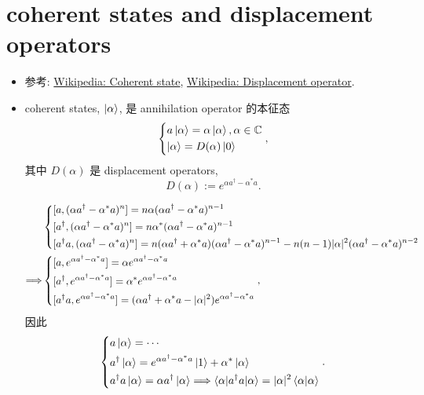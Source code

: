 \documentclass[10pt, a4paper]{article}
\numberwithin{equation}{section}
\begin{document}
	\section{coherent states and displacement operators}
	\begin{itemize}
		\item 参考: \href{https://en.wikipedia.org/wiki/Coherent_state}{Wikipedia: Coherent state}, \href{https://en.wikipedia.org/wiki/Displacement_operator}{Wikipedia: Displacement operator}.
		
		\item coherent states, $\ket{\alpha}$, 是 annihilation operator 的本征态
		\begin{equation}
			\begin{dcases}
				a \ket{\alpha} = \alpha \ket{\alpha}, \alpha \in \mathbb{C} \\
				\ket{\alpha} = D(\alpha) \ket{0}
			\end{dcases},
		\end{equation}
		其中 $D(\alpha)$ 是 displacement operators,
		\begin{equation}
			D(\alpha) := e^{\alpha a^\dag - \alpha^* a}.
		\end{equation}
		
		\begin{tcolorbox}[title=calculation:]
			\begin{align}
				& \begin{dcases}
					[a, (\alpha a^\dag - \alpha^* a)^n] = n \alpha (\alpha a^\dag - \alpha^* a)^{n - 1} \\
					[a^\dag, (\alpha a^\dag - \alpha^* a)^n] = n \alpha^* (\alpha a^\dag - \alpha^* a)^{n - 1} \\
					[a^\dag a, (\alpha a^\dag - \alpha^* a)^n] = n (\alpha a^\dag + \alpha^* a) (\alpha a^\dag - \alpha^* a)^{n - 1} - n (n - 1) |\alpha|^2 (\alpha a^\dag - \alpha^* a)^{n - 2}
				\end{dcases} \notag \\
				\Longrightarrow & \begin{dcases}
					[a, e^{\alpha a^\dag - \alpha^* a}] = \alpha e^{\alpha a^\dag - \alpha^* a} \\
					[a^\dag, e^{\alpha a^\dag - \alpha^* a}] = \alpha^* e^{\alpha a^\dag - \alpha^* a} \\
					[a^\dag a, e^{\alpha a^\dag - \alpha^* a}] = (\alpha a^\dag + \alpha^* a - |\alpha|^2) e^{\alpha a^\dag - \alpha^* a}
				\end{dcases},
			\end{align}
			因此
			\begin{equation} \label{A.4}
				\begin{dcases}
					a \ket{\alpha} = \cdots \\
					a^\dag \ket{\alpha} = e^{\alpha a^\dag - \alpha^* a} \ket{1} + \alpha^* \ket{\alpha} \\
					a^\dag a \ket{\alpha} = \alpha a^\dag \ket{\alpha} \Longrightarrow \braket{\alpha | a^\dag a | \alpha} = |\alpha|^2 \braket{\alpha | \alpha}
				\end{dcases}.
			\end{equation}
		\end{tcolorbox}
		

\end{itemize}
\end{document}
